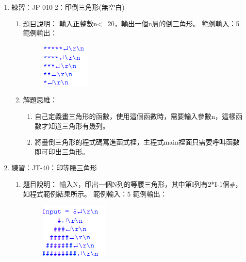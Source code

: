 \begin{enumerate}
	\item 練習︰JP-010-2：印倒三角形(無空白)
	\begin{enumerate}
		\item 題目說明：
		\subitem 輸入正整數n<=20，輸出一個n層的倒三角形。
		\subitem 範例輸入：5
		\subitem 範例輸出：
		\begin{figure}[H]
			\centering
			\includegraphics{fig/JP010fig}
		\end{figure}
		\item 解題思維：
		\begin{enumerate}
			\item 自己定義畫三角形的函數，使用這個函數時，需要輸入參數n，這樣函數才知道三角形有幾列。
			\item 將畫倒三角形的程式碼寫進函式裡，主程式main裡面只需要呼叫函數即可印出三角形。
		\end{enumerate}

	\end{enumerate}
	
	\item 練習︰JT-40：印等腰三角形
		\begin{enumerate}
			\item 題目說明：
			\subitem 輸入N，印出一個N列的等腰三角形，其中第I列有2*I-1個\#，如程式範例結果所示。
			\subitem 範例輸入：5
			\subitem 範例輸出：
			\begin{figure}[H]
				\centering
				\includegraphics{fig/JT40fig}
			\end{figure}
			

\end{enumerate}
\end{enumerate}
